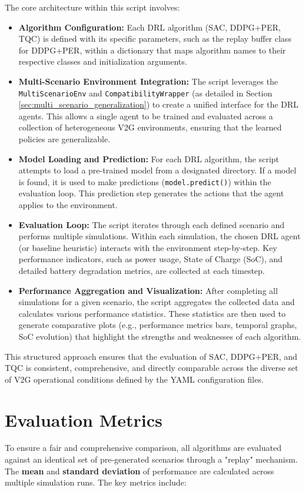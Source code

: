 The core architecture within this script involves:
\begin{itemize}
    \item \textbf{Algorithm Configuration:} Each DRL algorithm (SAC, DDPG+PER, TQC) is defined with its specific parameters, such as the replay buffer class for DDPG+PER, within a dictionary that maps algorithm names to their respective classes and initialization arguments.
    \item \textbf{Multi-Scenario Environment Integration:} The script leverages the \texttt{MultiScenarioEnv} and \texttt{CompatibilityWrapper} (as detailed in Section \ref{sec:multi_scenario_generalization}) to create a unified interface for the DRL agents. This allows a single agent to be trained and evaluated across a collection of heterogeneous V2G environments, ensuring that the learned policies are generalizable.
    \item \textbf{Model Loading and Prediction:} For each DRL algorithm, the script attempts to load a pre-trained model from a designated directory. If a model is found, it is used to make predictions (\texttt{model.predict()}) within the evaluation loop. This prediction step generates the actions that the agent applies to the environment.
    \item \textbf{Evaluation Loop:} The script iterates through each defined scenario and performs multiple simulations. Within each simulation, the chosen DRL agent (or baseline heuristic) interacts with the environment step-by-step. Key performance indicators, such as power usage, State of Charge (SoC), and detailed battery degradation metrics, are collected at each timestep.
    \item \textbf{Performance Aggregation and Visualization:} After completing all simulations for a given scenario, the script aggregates the collected data and calculates various performance statistics. These statistics are then used to generate comparative plots (e.g., performance metrics bars, temporal graphs, SoC evolution) that highlight the strengths and weaknesses of each algorithm.
\end{itemize}
This structured approach ensures that the evaluation of SAC, DDPG+PER, and TQC is consistent, comprehensive, and directly comparable across the diverse set of V2G operational conditions defined by the YAML configuration files.

\section{Evaluation Metrics}
To ensure a fair and comprehensive comparison, all algorithms are evaluated against an identical set of pre-generated scenarios through a "replay" mechanism. The \textbf{mean} and \textbf{standard deviation} of performance are calculated across multiple simulation runs. The key metrics include:

